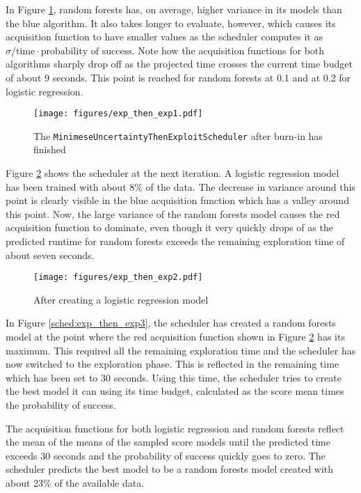 \documentclass[a4paper,12pt,twoside,openright]{report}
\begin{document}
In Figure \ref{sched:exp_then_exp1}, random forests has, on average, higher variance in its models than the blue algorithm. It also takes longer to evaluate, however, which causes its acquisition function to have smaller values as the scheduler computes it as $\sigma/\text{time} \cdot \text{probability of success}$. Note how the acquisition functions for both algorithms sharply drop off as the projected time crosses the current time budget of about 9 seconds. This point is reached for random forests at 0.1 and at 0.2 for logistic regression.



\begin{figure}
\centering
  \texttt{[image: figures/exp\_then\_exp1.pdf]}
  \caption{The \texttt{MinimeseUncertaintyThenExploitScheduler} after burn-in has finished}
  \label{sched:exp_then_exp1}
\end{figure}

Figure \ref{sched:exp_then_exp2} shows the scheduler at the next iteration. A logistic regression model has been trained with about 8\% of the data. The decrease in variance around this point is clearly visible in the blue acquisition function which has a valley around this point. Now, the large variance of the random forests model causes the red acquisition function to dominate, even though it very quickly drops of as the predicted runtime for random forests exceeds the remaining exploration time of about seven seconds.

\begin{figure}
\centering
  \texttt{[image: figures/exp\_then\_exp2.pdf]}
  \caption{After creating a logistic regression model}
  \label{sched:exp_then_exp2}
\end{figure}


In Figure \ref{sched:exp_then_exp3}, the scheduler has created a random forests model at the point where the red acquisition function shown in Figure \ref{sched:exp_then_exp2} has its maximum. This required all the remaining exploration time and the scheduler has now switched to the exploration phase. This is reflected in the remaining time which has been set to 30 seconds. Using this time, the scheduler tries to create the best model it can using its time budget, calculated as the score mean times the probability of success.

The acquisition functions for both logistic regression and random forests reflect the mean of the means of the sampled score models until the predicted time exceeds 30 seconds and the probability of success quickly goes to zero. The scheduler predicts the best model to be a random forests model created with about 23\% of the available data.
\end{document}
